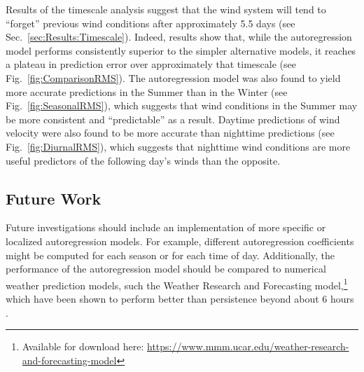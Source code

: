 \documentclass[11pt, oneside]{article}
\newcommand{\figref}[1]{Fig.~\ref{#1}}
\newcommand{\secref}[1]{Sec.~\ref{#1}}
\begin{document}
Results of the timescale analysis suggest that the wind system will tend to ``forget'' previous wind conditions after approximately 5.5 days (see \secref{sec:Results:Timescale}).
Indeed, results show that, while the autoregression model performs consistently superior to the simpler alternative models, it reaches a plateau in prediction error over approximately that timescale (see \figref{fig:ComparisonRMS}).
The autoregression model was also found to yield more accurate predictions in the Summer than in the Winter (see \figref{fig:SeasonalRMS}), which suggests that wind conditions in the Summer may be more consistent and ``predictable'' as a result.
Daytime predictions of wind velocity were also found to be more accurate than nighttime predictions (see \figref{fig:DiurnalRMS}), which suggests that nighttime wind conditions are more useful predictors of the following day's winds than the opposite.

\subsection{Future Work}
Future investigations should include an implementation of more specific or localized autoregression models.
For example, different autoregression coefficients might be computed for each season or for each time of day.
Additionally, the performance of the autoregression model should be compared to numerical weather prediction models, such the Weather Research and Forecasting model,\footnote{Available for download here: \url{https://www.mmm.ucar.edu/weather-research-and-forecasting-model}} which have been shown to perform better than persistence beyond about 6 hours \citep{Giebel2011,LandbergWatson1994}.



\end{document}
